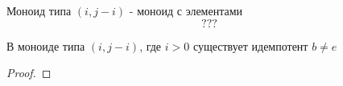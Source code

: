 \documentclass[../main/document.tex]{subfiles}
\begin{document}
\begin{dfn}
Моноид типа $(i,j-i)$ - моноид с элементами $$???$$
\end{dfn}

\begin{thm}
В моноиде типа $(i,j-i)$, где $i>0$ существует идемпотент $b\neq e$
\begin{proof}

\end{proof}
\end{thm}
\end{document}

